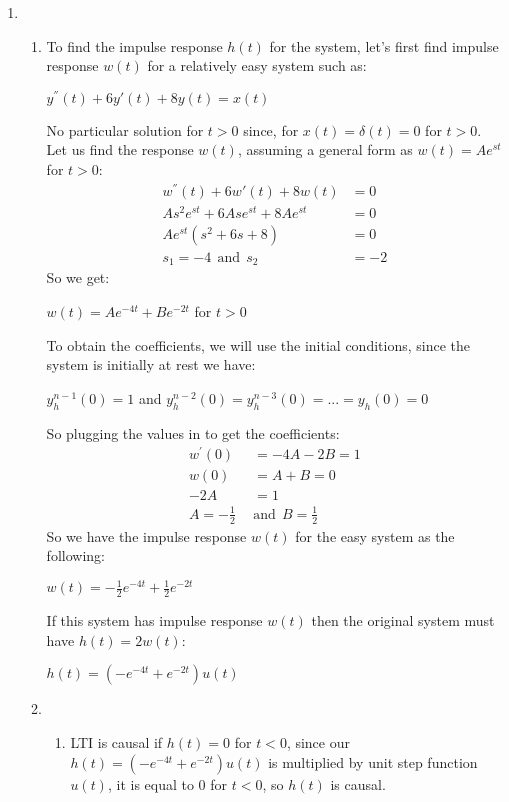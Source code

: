 \documentclass[10pt,a4paper, margin=1in]{article}
\begin{document}
\begin{enumerate}
\item 
    \begin{enumerate}
    \item
    To find the impulse response $h(t)$ for the system, let's first find impulse response $w(t)$ for a relatively easy system such as:
    \begin{center}
    $y^{''}(t)+6y{'}(t)+8y(t)=x(t)$
    \end{center}
    No particular solution for $t>0$ since, for $x(t)=\delta(t)=0$ for $t > 0$. Let us find the response $w(t)$, assuming a general form as $w(t) = Ae^{st}$ for $t > 0$: 
    \begin{align*}
     w^{''}(t)+6w{'}(t)+8w(t)&=0 \\
     As^2e^{st}+6Ase^{st}+8Ae^{st}&=0 \\
     Ae^{st}(s^2+6s+8)&=0 \\
     s_1 = -4 \ \ \text{and} \ \ s_2 &= -2
    \end{align*}
    So we get:
    \begin{center}
    $w(t)=Ae^{-4t}+Be^{-2t}$ for $t > 0$
    \end{center}
    To obtain the coefficients, we will use the initial conditions, since the system is initially at rest we have:
    \begin{center}
    $y_h^{n-1}(0)=1$ and $y_h^{n-2}(0)=y_h^{n-3}(0)=...=y_h(0)=0$
    \end{center}
  	So plugging the values in to get the coefficients:
	\begin{align*}
	w^{'}(0)&=-4A-2B=1 \\
	w(0)&=A+B=0 \\
	-2A &= 1 \\
	A=-\frac{1}{2} \ \ &\text{and} \ \ B=\frac{1}{2}	
	\end{align*}
	So we have the impulse response $w(t)$ for the easy system as the following:
	\begin{center}
	$w(t)=-\frac{1}{2}e^{-4t}+\frac{1}{2}e^{-2t}$
	\end{center}
	If this system has impulse response $w(t)$ then the original system must have $h(t)=2w(t)$:
	\begin{center}
	$h(t)=(-e^{-4t}+e^{-2t})u(t)$ \\
	\end{center}
    \item
    	\begin{enumerate}
    	\item
        LTI is causal if $h(t)=0$ for $t<0$, since our $h(t)=(-e^{-4t}+e^{-2t})u(t)$ is multiplied by unit step function $u(t)$, it is equal to 0 for $t<0$, so $h(t)$ is causal. \\

\end{enumerate}
\end{enumerate}
\end{enumerate}
\end{document}
